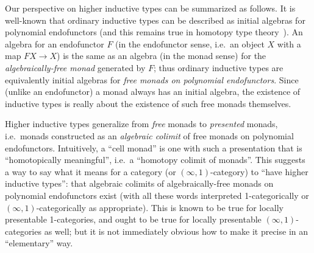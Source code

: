 \documentclass[referee]{psp}
\begin{document}
Our perspective on higher inductive types can be summarized as follows.
It is well-known that ordinary inductive types can be described as initial algebras for polynomial endofunctors (and this remains true in homotopy type theory~\cite{ags:it-hott}).
An algebra for an endofunctor $F$ (in the endofunctor sense, i.e.\ an object $X$ with a map $F X \to X$) is the same as an algebra (in the monad sense) for the \emph{algebraically-free monad} generated by $F$; thus ordinary inductive types are equivalently initial algebras for \emph{free monads on polynomial endofunctors}.
Since (unlike an endofunctor) a monad always has an initial algebra, the existence of inductive types is really about the existence of such free monads themselves.

Higher inductive types generalize from \emph{free} monads to \emph{presented} monads, i.e.\ monads constructed as an \emph{algebraic colimit} of free monads on polynomial endofunctors.
Intuitively, a ``cell monad'' is one with such a presentation that is ``homotopically meaningful'', i.e.\ a ``homotopy colimit of monads''.
This suggests a way to say what it means for a category (or $(\infty,1)$-category) to ``have higher inductive types'': that algebraic colimits of algebraically-free monads on polynomial endofunctors exist (with all these words interpreted 1-categorically or $(\infty,1)$-categorically as appropriate).
This is known to be true for locally presentable 1-categories, and ought to be true for locally presentable $(\infty,1)$-categories as well; but it is not immediately obvious how to make it precise in an ``elementary'' way.
\end{document}
